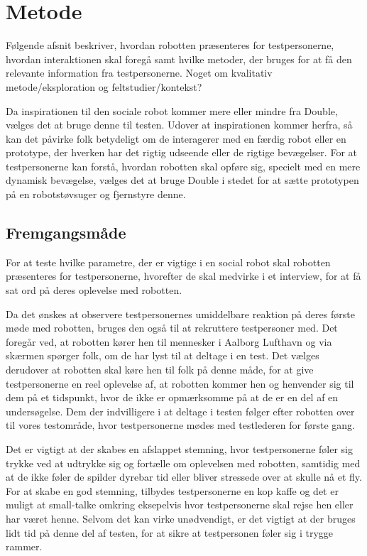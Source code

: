 \section{Metode}
\label{ParametreMetode}
%
Følgende afsnit beskriver, hvordan robotten præsenteres for testpersonerne, hvordan interaktionen skal foregå samt hvilke metoder, der bruges for at få den relevante information fra testpersonerne.\blankline
%
Noget om kvalitativ metode/eksploration og feltstudier/kontekst?\blankline 

Da inspirationen til den sociale robot kommer mere eller mindre fra Double, vælges det at bruge denne til testen. Udover at inspirationen kommer herfra, så kan det påvirke folk betydeligt om de interagerer med en færdig robot eller en prototype, der hverken har det rigtig udseende eller de rigtige bevægelser. For at testpersonerne kan forstå, hvordan robotten skal opføre sig, specielt med en mere dynamisk bevægelse, vælges det at bruge Double i stedet for at sætte prototypen på en robotstøvsuger og fjernstyre denne. 

\subsection{Fremgangsmåde}
\label{ParametreFremgangsmaade}
%
For at teste hvilke parametre, der er vigtige i en social robot skal robotten præsenteres for testpersonerne, hvorefter de skal medvirke i et interview, for at få sat ord på deres oplevelse med robotten. 

Da det ønskes at observere testpersonernes umiddelbare reaktion på deres første møde med robotten, bruges den også til at rekruttere testpersoner med. Det foregår ved, at robotten kører hen til mennesker i Aalborg Lufthavn og via skærmen spørger folk, om de har lyst til at deltage i en test. Det vælges derudover at robotten skal køre hen til folk på denne måde, for at give testpersonerne en reel oplevelse af, at robotten kommer hen og henvender sig til dem på et tidspunkt, hvor de ikke er opmærksomme på at de er en del af en undersøgelse. Dem der indvilligere i at deltage i testen følger efter robotten over til vores testområde, hvor testpersonerne mødes med testlederen for første gang.\blankline

Det er vigtigt at der skabes en afslappet stemning, hvor testpersonerne føler sig trykke ved at udtrykke sig og fortælle om oplevelsen med robotten, samtidig med at de ikke føler de spilder dyrebar tid eller bliver stressede over at skulle nå et fly. For at skabe en god stemning, tilbydes testpersonerne en kop kaffe og det er muligt at small-talke omkring eksepelvis hvor testpersonerne skal rejse hen eller har været henne. Selvom det kan virke unødvendigt, er det vigtigt at der bruges lidt tid på denne del af testen, for at sikre at testpersonen føler sig i trygge rammer. 

